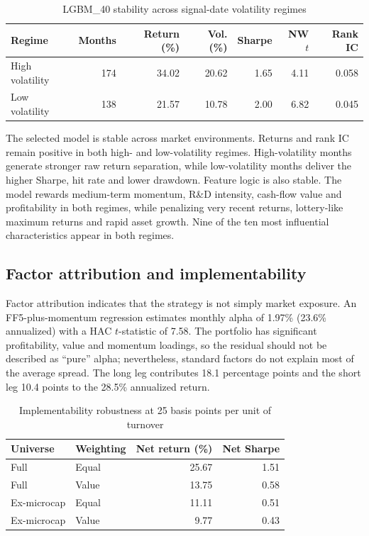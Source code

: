 \documentclass[11pt,a4paper]{article}
\begin{document}
\begin{table}[ht]
\centering\small
\caption{LGBM\_40 stability across signal-date volatility regimes}
\label{tab:regime}
\begin{tabular}{lrrrrrr}
\toprule
Regime & Months & Return (\%) & Vol. (\%) & Sharpe & NW $t$ & Rank IC \\
\midrule
High volatility & 174 & 34.02 & 20.62 & 1.65 & 4.11 & 0.058 \\
Low volatility & 138 & 21.57 & 10.78 & 2.00 & 6.82 & 0.045 \\
\bottomrule
\end{tabular}
\end{table}

The selected model is stable across market environments. Returns and rank IC remain positive in both high- and low-volatility regimes. High-volatility months generate stronger raw return separation, while low-volatility months deliver the higher Sharpe, hit rate and lower drawdown. Feature logic is also stable. The model rewards medium-term momentum, R\&D intensity, cash-flow value and profitability in both regimes, while penalizing very recent returns, lottery-like maximum returns and rapid asset growth. Nine of the ten most influential characteristics appear in both regimes.

\subsection*{Factor attribution and implementability}

Factor attribution indicates that the strategy is not simply market exposure. An FF5-plus-momentum regression estimates monthly alpha of 1.97\% (23.6\% annualized) with a HAC $t$-statistic of 7.58. The portfolio has significant profitability, value and momentum loadings, so the residual should not be described as ``pure'' alpha; nevertheless, standard factors do not explain most of the average spread. The long leg contributes 18.1 percentage points and the short leg 10.4 points to the 28.5\% annualized return.

\begin{table}[ht]
\centering\small
\caption{Implementability robustness at 25 basis points per unit of turnover}
\label{tab:costs}
\begin{tabular}{llrr}
\toprule
Universe & Weighting & Net return (\%) & Net Sharpe \\
\midrule
Full & Equal & 25.67 & 1.51 \\
Full & Value & 13.75 & 0.58 \\
Ex-microcap & Equal & 11.11 & 0.51 \\
Ex-microcap & Value & 9.77 & 0.43 \\
\bottomrule
\end{tabular}
\end{table}
\end{document}
